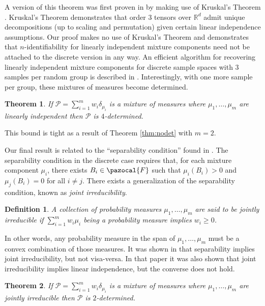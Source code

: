 \documentclass[aos,preprint]{imsart}
\def\rn{\mathbb{R}}
\def\sF{\pazocal{F}}
\def\sP{\mathscr{P}}
\theoremstyle{plain}
\newtheorem{thm}{Theorem}[section]
\theoremstyle{defintion}
\newtheorem{defin}{Definition}[section]
\begin{document}
	A version of this theorem was first proven in \cite{allman09} by making use of Kruskal's Theorem \cite{kruskal77}. Kruskal's Theorem demonstrates that order 3 tensors over $\rn^d$ admit unique decompositions (up to scaling and permutation) given certain linear independence assumptions. Our proof makes no use of Kruskal's Theorem and demonstrates that $n$-identifiability for linearly independent mixture components need not be attached to the discrete version in any way. An efficient algorithm for recovering linearly independent mixture components for discrete sample spaces with 3 samples per random group is described in \cite{anandkumar14}. Interestingly, with one more sample per group, these mixtures of measures become determined.
	\begin{thm} \label{thm:lidet}
		\sloppy If $\sP = \sum_{i=1}^m  w_i\delta_{\mu_i}$ is a mixture of measures where $\mu_1,\ldots,\mu_m$ are linearly independent then $\sP$ is $4$-determined.
	\end{thm}
	This bound is tight as a result of Theorem \ref{thm:nodet} with $m=2$.

	Our final result is related to the ``separability condition'' found in \cite{donoho03}. The separability condition in the discrete case requires that, for each mixture component $\mu_i$, there exists $B_i\in \sF$ such that $\mu_i\left( B_i \right)>0$ and $\mu_j\left( B_i \right) = 0$ for all $i\neq j$. There exists a generalization of the separability condition, known as {\em joint irreducibility}.
	\begin{defin}
		A collection of probability measures $\mu_1,\ldots,\mu_m$ are said to be {\em jointly irreducible} if $\sum_{i=1}^{m} w_i \mu_i$ being a probability measure implies $w_i\ge0$. 
	\end{defin}
	In other words, any probability measure in the span of $\mu_1,\ldots,\mu_m$ must be a convex combination of those measures. It was shown in \cite{blanchard14} that separability implies joint irreducibility, but not visa-versa. In that paper it was also shown that joint irreducibility implies linear independence, but the converse does not hold. 
	\begin{thm} \label{thm:ji}
		\sloppy If $\sP= \sum_{i=1}^m w_i \delta_{\mu_i} $ is a mixture of measures where $\mu_1,\ldots, \mu_m$ are jointly irreducible then $\sP$ is $2$-determined.
	\end{thm}
\end{document}
